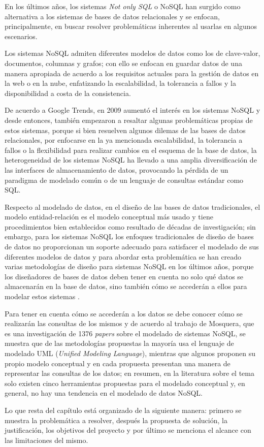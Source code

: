 En los últimos años, los sistemas \textit{Not only SQL} o NoSQL han surgido como alternativa a los sistemas de bases de datos relacionales y se enfocan, principalmente, en buscar resolver problemáticas inherentes al usarlas en algunos escenarios.


Los sistemas NoSQL admiten diferentes modelos de datos como los de clave-valor, documentos, columnas y grafos; con ello se enfocan en guardar datos de una manera apropiada de acuerdo a los requisitos actuales para la gestión de datos en la web o en la nube, enfatizando la escalabilidad, la tolerancia a fallos y la disponibilidad a costa de la consistencia.



De acuerdo a Google Trends\cite{google_google_2020}, en 2009 aumentó el interés en los sistemas NoSQL y desde entonces, también empezaron a resaltar algunas problemáticas propias de estos sistemas, porque si bien resuelven algunos dilemas de las bases de datos relacionales, por enfocarse en la ya mencionada escalabilidad, la tolerancia a fallos o la flexibilidad para realizar cambios en el esquema de la base de datos, la heterogeneidad de los sistemas NoSQL ha llevado a una amplia diversificación de las interfaces de almacenamiento de datos, provocando la pérdida de un paradigma de modelado común o de un lenguaje de consultas estándar como SQL.


Respecto al modelado de datos, en el diseño de las bases de datos tradicionales, el modelo entidad-relación\cite{codd_relational_nodate} es el modelo conceptual más usado y tiene procedimientos bien establecidos como resultado de décadas de investigación; sin embargo, para los sistemas NoSQL los enfoques tradicionales de diseño de bases de datos no proporcionan un soporte adecuado para satisfacer el modelado de sus diferentes modelos de datos y para abordar esta problemática se han creado varias metodologías de diseño para sistemas NoSQL en los últimos años, porque los diseñadores de bases de datos deben tener en cuenta no solo qué datos se almacenarán en la base de datos, sino también cómo se accederán a ellos para modelar estos sistemas \cite{li_transforming_2010,chebotko_big_2015,mior_nose_2017}. 


Para tener en cuenta cómo se accederán a los datos se debe conocer cómo se realizarán las consultas de los mismos y de acuerdo al trabajo de Mosquera\cite{martinez-mosquera_modeling_2020}, que es una investigación de 1376 \textit{papers} sobre el modelado de sistemas NoSQL, se muestra que de las metodologías propuestas la mayoría usa el lenguaje de modelado UML (\textit{Unified Modeling Language}), mientras que algunos proponen su propio modelo conceptual  y en cada propuesta presentan una manera de representar las consultas de los datos; en resumen, en la literatura sobre el tema solo existen cinco herramientas propuestas para el modelado conceptual y, en general, no hay una tendencia en el modelado de datos NoSQL.


Lo que resta del capítulo está organizado de la siguiente manera: primero se muestra la problemática a resolver, después la propuesta de solución, la justificación, los objetivos del proyecto y por último se menciona el alcance con las limitaciones del mismo.